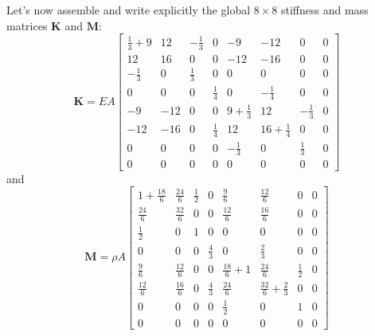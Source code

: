 \documentclass[12pt]{article}
\begin{document}
Let's now assemble and write explicitly the global $8 \times 8$ stiffness and mass matrices $\mathbf{K}$ and $\mathbf{M}$:
\[
	\mathbf{K} =
	EA
	\begin{bmatrix}
		\frac{1}{3} + 9 & 12  & -\frac{1}{3} & 0           & -9              & -12              & 0            & 0 \\[5pt]
		12              & 16  & 0            & 0           & -12             & -16              & 0            & 0 \\[5pt]
		-\frac{1}{3}    & 0   & \frac{1}{3}  & 0           & 0               & 0                & 0            & 0 \\[5pt]
		0               & 0   & 0            & \frac{1}{4} & 0               & -\frac{1}{4}     & 0            & 0 \\[5pt]
		-9              & -12 & 0            & 0           & 9 + \frac{1}{3} & 12               & -\frac{1}{3} & 0 \\[5pt]
		-12             & -16 & 0            & \frac{1}{4} & 12              & 16 + \frac{1}{4} & 0            & 0 \\[5pt]
		0               & 0   & 0            & 0           & -\frac{1}{3}    & 0                & \frac{1}{3}  & 0 \\[5pt]
		0               & 0   & 0            & 0           & 0               & 0                & 0            & 0
	\end{bmatrix}
\]
and
\[
	\mathbf{M} = \rho A
	\begin{bmatrix}
		1 + \frac{18}{6} & \frac{24}{6} & \frac{1}{2} & 0           & \frac{9}{6}     & \frac{12}{6}               & 0           & 0 \\[5pt]
		\frac{24}{6}     & \frac{32}{6} & 0           & 0           & \frac{12}{6}    & \frac{16}{6}               & 0           & 0 \\[5pt]
		\frac{1}{2}      & 0            & 1           & 0           & 0               & 0                          & 0           & 0 \\[5pt]
		0                & 0            & 0           & \frac{4}{3} & 0               & \frac{2}{3}                & 0           & 0 \\[5pt]
		\frac{9}{6}      & \frac{12}{6} & 0           & 0           & \frac{18}{6}+ 1 & \frac{24}{6}               & \frac{1}{2} & 0 \\[5pt]
		\frac{12}{6}     & \frac{16}{6} & 0           & \frac{4}{3} & \frac{24}{6}    & \frac{32}{6} + \frac{2}{3} & 0           & 0 \\[5pt]
		0                & 0            & 0           & 0           & \frac{1}{2}     & 0                          & 1           & 0 \\[5pt]
		0                & 0            & 0           & 0           & 0               & 0                          & 0           & 0
	\end{bmatrix}
\]
\end{document}
